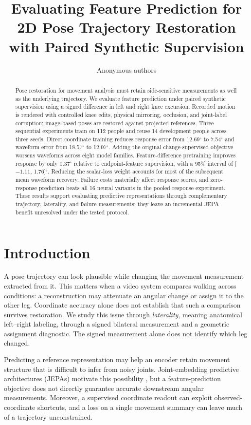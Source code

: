 \documentclass{article}
\title{Evaluating Feature Prediction for 2D Pose Trajectory Restoration with Paired Synthetic Supervision}
\author{Anonymous authors}
\newcommand{\degunit}{^{\circ}}
\begin{document}
\maketitle
\begin{abstract}
Pose restoration for movement analysis must retain side-sensitive measurements as well as the underlying trajectory. We evaluate feature prediction under paired synthetic supervision using a signed difference in left and right knee excursion. Recorded motion is rendered with controlled knee edits, physical mirroring, occlusion, and joint-label corruption; image-based poses are restored against projected references. Three sequential experiments train on 112 people and reuse 14 development people across three seeds. Direct coordinate training reduces response error from 12.69$\degunit$ to 7.54$\degunit$ and waveform error from 18.57$\degunit$ to 12.07$\degunit$. Adding the original change-supervised objective worsens waveforms across eight model families. Feature-difference pretraining improves response by only 0.37$\degunit$ relative to endpoint-feature supervision, with a 95\% interval of [$-1.11$, 1.76]$\degunit$. Reducing the scalar-loss weight accounts for most of the subsequent mean waveform recovery. Failure costs materially affect response scores, and zero-response prediction beats all 16 neural variants in the pooled response experiment. These results support evaluating predictive representations through complementary trajectory, laterality, and failure measurements; they leave an incremental JEPA benefit unresolved under the tested protocol.
\end{abstract}

\section{Introduction}
A pose trajectory can look plausible while changing the movement measurement extracted from it. This matters when a video system compares walking across conditions: a reconstruction may attenuate an angular change or assign it to the other leg. Coordinate accuracy alone does not establish that such a comparison survives restoration. We study this issue through \emph{laterality}, meaning anatomical left--right labeling, through a signed bilateral measurement and a geometric assignment diagnostic. The signed measurement alone does not identify which leg changed.

Predicting a reference representation may help an encoder retain movement structure that is difficult to infer from noisy joints. Joint-embedding predictive architectures (JEPAs) motivate this possibility \citep{assran2023ijepa,bardes2024vjepa}, but a feature-prediction objective does not directly guarantee accurate downstream angular measurements. Moreover, a supervised coordinate readout can exploit observed-coordinate shortcuts, and a loss on a single movement summary can leave much of a trajectory unconstrained.
\end{document}
